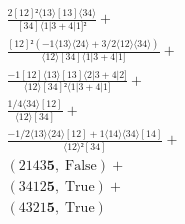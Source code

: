 \documentclass[varwidth, border=5pt]{standalone}
\begin{document}
\begin{my}
$\begin{gathered}
\scriptscriptstyle\frac{2[12]²⟨13⟩[13]⟨34⟩}{[34]⟨1|3+4|1]²} +\\
\scriptscriptstyle\frac{[12]²(-1⟨13⟩⟨24⟩+3/2⟨12⟩⟨34⟩)}{⟨12⟩[34]⟨1|3+4|1]} +\\
\scriptscriptstyle\frac{-1[12]⟨13⟩[13]⟨2|3+4|2]}{⟨12⟩[34]²⟨1|3+4|1]} +\\
\scriptscriptstyle\frac{1/4⟨34⟩[12]}{⟨12⟩[34]} +\\
\scriptscriptstyle\frac{-1/2⟨13⟩⟨24⟩[12]+1⟨14⟩⟨34⟩[14]}{⟨12⟩²[34]} +\\
\scriptscriptstyle(2143𝟓,\;\text{False}) +\\
\scriptscriptstyle(3412𝟓,\;\text{True}) +\\
\scriptscriptstyle(4321𝟓,\;\text{True}) \phantom{+}
\end{gathered}$
\end{my}
\end{document}
